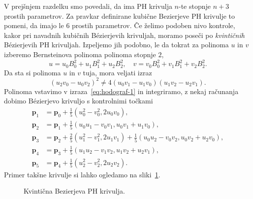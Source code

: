 \documentclass[isrm2, tisk]{fmfdelo}
\newcommand{\p}{\mathbf{p}}
\begin{document}
    V prejšnjem razdelku smo povedali, da ima PH krivulja $n$-te stopnje $n+3$ prostih parametrov.
    Za pravkar definirane kubične Bezierjeve PH krivulje to pomeni, da imajo le $6$ prostih parametrov.
    Če želimo podoben nivo kontrole, kakor pri navadnih kubičnih Bézierjevih krivuljah, moramo poseči po \textit{kvintičnih} Bézierjevih PH krivuljah.
    Izpeljemo jih podobno, le da tokrat za polinoma $u$ in $v$  izberemo Bernsteinova polinoma polinoma stopnje $2$,
    \[u=u_0B_{0}^{2}+u_1B_{1}^{2}+u_2B_{2}^{2}, \quad v=v_0B_{0}^{2}+v_1B_{1}^{2}+v_2B_{2}^{2}.\]
    Da sta si polinoma $u$ in $v$ tuja, mora veljati izraz \[(u_2 v_0 -u_0 v_2)^2 \neq 4(u_0 v_1 - u_1 v_0)(u_1 v_2-u_2v_1).\]
    Polinoma vstavimo v izraza~\eqref{eq:hodograf-1} in integriramo, z nekaj računanja dobimo Bézierjevo krivuljo s kontrolnimi točkami
    \begin{align*}
        \p_1 &=\p_0+\frac{1}{5}(u_0^2-v_0^2,2u_0v_0), \\
        \p_2 &= \p_1+\frac{1}{5}(u_0u_1-v_0v_1, u_0v_1+u_1v_0),\\
        \p_3 &= \p_2 + \frac{2}{5}(u_1^2-v_1^2, 2u_1v_1) + \frac{1}{5}(u_0u_2-v_0v_2, u_0v_2+u_2v_0),  \\
        \p_4 &= \p_3+\frac{1}{5}(u_1u_2-v_1v_2, u_1v_2+u_2v_1),\\
        \p_5 &=\p_4+\frac{1}{5}(u_2^2-v_2^2,2u_2v_2).  \label{eq:ph-kontrolne-5}
    \end{align*}
    Primer takšne krivulje si lahko ogledamo na sliki~\ref{fig:kvinticna-ph}.
    \begin{figure}[h]
        \centering
        \caption{Kvintična Bezierjeva PH krivulja.}\label{fig:kvinticna-ph}
    \end{figure}
\end{document}

